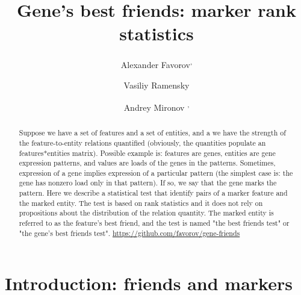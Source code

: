 \documentclass{llncs}
\begin{document}
%
\title{Gene's best friends: marker rank statistics}
%
%
\author{Alexander Favorov\textsuperscript, \and Vasiliy Ramensky 
\and Andrey Mironov \textsuperscript,}
%
%
%

\maketitle              %

\begin{abstract}
Suppose we have a set of features and a set of entities, and a we have the strength of the feature-to-entity relations quantified (obviously, the quantities populate an features*entities matrix). Possible example is: features are genes, entities are gene expression patterns, and values are loads of the genes in the patterns. Sometimes, expression of a gene implies expression of a particular pattern (the simplest case is: the gene has nonzero load only in that pattern). If so, we say that the gene marks the pattern. Here we describe a statistical test that identify pairs of a marker feature and the marked entity. The test is based on rank statistics and it does not rely on propositions about the distribution of the relation quantity. The marked entity is referred to as the feature's best friend, and the test is named "the best friends test" or "the gene's best friends test". \url{https://github.com/favorov/gene-friends}
\end{abstract}
%
\section{Introduction: friends and markers}
\end{document}
